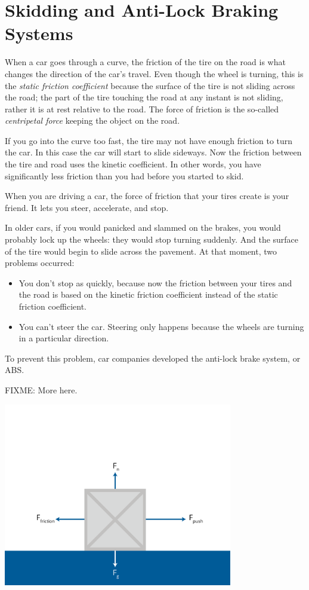 \section{Skidding and Anti-Lock Braking Systems}

When a car goes through a curve, the friction of the tire on the road is what changes the direction of the 
car's travel. Even though the wheel is turning, this is the \emph{static friction coefficient} because the surface of the tire is not sliding across the road; the part of the tire touching the road at any instant is not sliding, rather it is at rest relative to the road. The force of friction is the so-called \emph{centripetal force} keeping the object on the road.

If you go into the curve too fast, the tire may not have enough friction to turn the car. In this case the car will start to slide sideways. Now the friction between the tire and road uses the kinetic coefficient. In other words, you have significantly less friction than you had before you started to skid.

When you are driving a car, the force of friction that your tires create is your friend. It lets you steer, accelerate, and stop.

In older cars, if you would panicked and slammed on the brakes, you would probably lock up the wheels: they would stop turning suddenly. And the surface of the tire would begin to slide across the pavement. At that moment, two problems occurred:
\begin{itemize}
\item You don't stop as quickly, because now the friction between your tires and the road is based on the kinetic friction coefficient instead of the static friction coefficient.
\item You can't steer the car. Steering only happens because the wheels are turning in a particular direction.
\end{itemize}

To prevent this problem, car companies developed the anti-lock brake system, or ABS.

FIXME: More here.

\includegraphics[width=0.75\textwidth]{friction-01.png}

